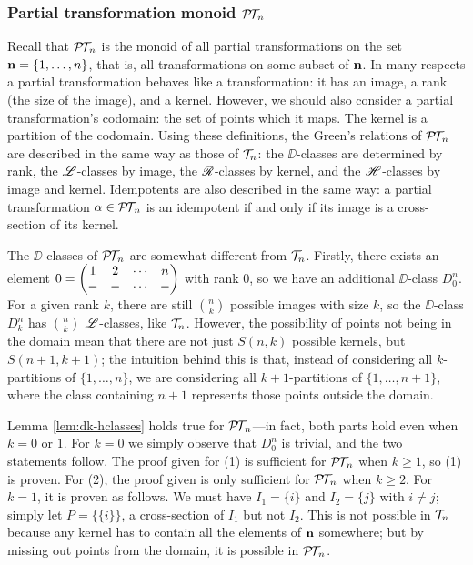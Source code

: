 \subsubsection{Partial transformation monoid $\mathcal{P\!T\!}_n$}
\label{sec:princfact-in}
Recall that $\mathcal{P\!T\!}_n$ is the monoid of all partial transformations on the set
$\mathbf{n} = \{1, \ldots, n\}$, that is, all transformations on some subset of $\mathbf{n}$.
In many respects a partial transformation behaves like a transformation: it has
an image, a rank (the size of the image), and a kernel.  However, we should also
consider a partial transformation's codomain: the set of points which it maps.
The kernel is a partition of the codomain.  Using these definitions, the Green's
relations of $\mathcal{P\!T\!}_n$ are described in the same way as those of $\mathcal{T}_n$: the
$\DD$-classes are determined by rank, the $\mathrel{\mathscr{L}}$-classes by image, the
$\mathrel{\mathscr{R}}$-classes by kernel, and the $\mathrel{\mathscr{H}}$-classes by image and kernel.  Idempotents
are also described in the same way: a partial transformation $\alpha \in \mathcal{P\!T\!}_n$
is an idempotent if and only if its image is a cross-section of its kernel.

The $\DD$-classes of $\mathcal{P\!T\!}_n$ are somewhat different from $\mathcal{T}_n$.  Firstly, there
exists an element $0 = \begin{pmatrix} 1 & 2 & \cdots & n \\ - & - & \cdots & - \end{pmatrix}$ with rank $0$, so we have an additional
$\DD$-class $D_0^n$.  For a given rank $k$, there are still $\binom{n}{k}$
possible images with size $k$, so the $\DD$-class $D_k^n$ has $\binom{n}{k}$
$\mathrel{\mathscr{L}}$-classes, like $\mathcal{T}_n$.  However, the possibility of points not being in the
domain mean that there are not just $S(n,k)$ possible kernels, but
$S(n+1, k+1)$; the intuition behind this is that, instead of considering all
$k$-partitions of $\{1, \ldots, n\}$, we are considering all $k+1$-partitions of
$\{1, \ldots, n+1\}$, where the class containing $n+1$ represents those points
outside the domain.

Lemma \ref{lem:dk-hclasses} holds true for $\mathcal{P\!T\!}_n$---in fact, both parts hold
even when $k = 0$ or $1$.  For $k=0$ we simply observe that $D_0^n$ is trivial,
and the two statements follow.  The proof given for (1) is sufficient for
$\mathcal{P\!T\!}_n$ when $k \geq 1$, so (1) is proven.  For (2), the proof given is only
sufficient for $\mathcal{P\!T\!}_n$ when $k \geq 2$.  For $k=1$, it is proven as follows.  We
must have $I_1 = \{i\}$ and $I_2 = \{j\}$ with $i \neq j$; simply let
$P = \big\{\{i\}\big\}$, a cross-section of $I_1$ but not $I_2$.  This is not
possible in $\mathcal{T}_n$ because any kernel has to contain all the elements of $\mathbf{n}$
somewhere; but by missing out points from the domain, it is possible in $\mathcal{P\!T\!}_n$.

